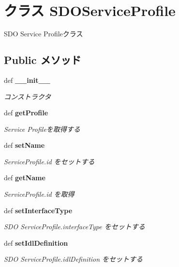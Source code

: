 \section{クラス SDOServiceProfile}
\label{classsource__py_1_1_sdo_service_1_1_s_d_o_service_profile}
SDO Service Profileクラス  


\subsection*{Public メソッド}
\begin{CompactItemize}
\item 
def {\bf \_\-\_\-init\_\-\_\-}
\begin{CompactList}\small\item\em コンストラクタ \item\end{CompactList}\item 
def {\bf getProfile}
\begin{CompactList}\small\item\em Service Profileを取得する \item\end{CompactList}\item 
def {\bf setName}
\begin{CompactList}\small\item\em ServiceProfile.id をセットする \item\end{CompactList}\item 
def {\bf getName}
\begin{CompactList}\small\item\em ServiceProfile.id を取得 \item\end{CompactList}\item 
def {\bf setInterfaceType}
\begin{CompactList}\small\item\em SDO ServiceProfile.interfaceType をセットする \item\end{CompactList}\item 
def {\bf setIdlDefinition}
\begin{CompactList}\small\item\em SDO ServiceProfile.idlDefinition をセットする \item\end{CompactList}\item 

\end{CompactItemize}
